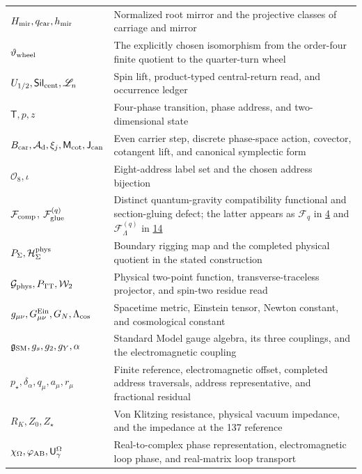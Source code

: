 \begin{longtable}[]{@{}
  >{\raggedright\arraybackslash}p{}
  >{\raggedright\arraybackslash}p{}@{}}
\(H_{\rm mir},q_{\rm car},h_{\rm mir}\) & Normalized root mirror and the projective classes of carriage and mirror \\
\(\vartheta_{\rm wheel}\) & The explicitly chosen isomorphism from the order-four finite quotient to the quarter-turn wheel \\
\(U_{1/2},\mathsf{Sil}_{\rm cent},\mathscr L_n\) & Spin lift, product-typed central-return read, and occurrence ledger \\
\(\mathsf T,p,z\) & Four-phase transition, phase address, and two-dimensional state \\
\(B_{\rm car},\mathcal A_{\rm d},\xi_j,\mathsf M_{\rm cot},\mathsf J_{\rm can}\) & Even carrier step, discrete phase-space action, covector, cotangent lift, and canonical symplectic form \\
\(\mathcal O_8,\iota\) & Eight-address label set and the chosen address bijection \\
\(\mathcal F_{\rm comp}\), \(\mathcal F_{\rm glue}^{(q)}\) & Distinct quantum-gravity compatibility functional and section-gluing defect; the latter appears as \(\mathcal F_q\) in \href{https://github.com/Coppalini-Architecture/coppalini-architecture/blob/9b7122ca5c3712c2c294e2bc5097276d0ba9817b/papers/motion-and-difference/motion-and-difference-2026-07-17.pdf}{4} and \(\mathcal F_\Lambda^{(q)}\) in \href{https://chatgpt.com/library?file_id=libfile_c45a658f83988191a4057b320f6b5048\&account_id=personal}{14} \\
\(P_\Sigma,\mathcal H_\Sigma^{\rm phys}\) & Boundary rigging map and the completed physical quotient in the stated construction \\
\(\mathcal G_{\rm phys},P_{\rm TT},\mathcal W_2\) & Physical two-point function, transverse-traceless projector, and spin-two residue read \\
\(g_{\mu\nu},G^{\rm Ein}_{\mu\nu},G_N,\Lambda_{\rm cos}\) & Spacetime metric, Einstein tensor, Newton constant, and cosmological constant \\
\(\mathfrak g_{\rm SM},g_s,g_2,g_Y,\alpha\) & Standard Model gauge algebra, its three couplings, and the electromagnetic coupling \\
\(p_\star,\delta_\alpha,q_\mu,a_\mu,r_\mu\) & Finite reference, electromagnetic offset, completed address traversals, address representative, and fractional residual \\
\(R_K,Z_0,Z_\star\) & Von Klitzing resistance, physical vacuum impedance, and the impedance at the 137 reference \\
\(\chi_\Omega,\varphi_{\rm AB},\mathsf U^\Omega_\gamma\) & Real-to-complex phase representation, electromagnetic loop phase, and real-matrix loop transport \\

\end{longtable}
